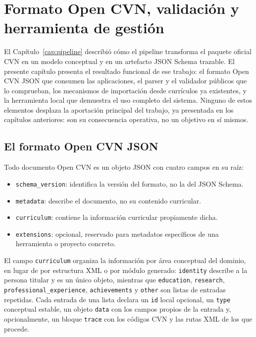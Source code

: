 \chapter{Formato Open CVN, validación y herramienta de gestión}
\label{cap:formato_herramienta}

El Capítulo~\ref{cap:pipeline} describió cómo el pipeline transforma el
paquete oficial CVN en un modelo conceptual y en un artefacto JSON Schema
trazable. El presente capítulo presenta el resultado funcional de ese
trabajo: el formato Open CVN JSON que consumen las aplicaciones, el parser y
el validador públicos que lo comprueban, los mecanismos de importación desde
currículos ya existentes, y la herramienta local que demuestra el uso
completo del sistema. Ninguno de estos elementos desplaza la aportación
principal del trabajo, ya presentada en los capítulos anteriores: son su
consecuencia operativa, no un objetivo en sí mismos.

\section{El formato Open CVN JSON}
\label{sec:formato_json}

Todo documento Open CVN es un objeto JSON con cuatro campos en su raíz:

\begin{itemize}
  \item \texttt{schema\_version}: identifica la versión del formato, no la
  del JSON Schema.

  \item \texttt{metadata}: describe el documento, no su contenido
  curricular.

  \item \texttt{curriculum}: contiene la información curricular propiamente
  dicha.

  \item \texttt{extensions}: opcional, reservado para metadatos específicos
  de una herramienta o proyecto concreto.
\end{itemize}

El campo \texttt{curriculum} organiza la información por área conceptual del
dominio, en lugar de por estructura XML o por módulo generado: \texttt{identity}
describe a la persona titular y es un único objeto, mientras que
\texttt{education}, \texttt{research}, \texttt{professional\_experience},
\texttt{achievements} y \texttt{other} son listas de entradas repetidas. Cada
entrada de una lista declara un \texttt{id} local opcional, un \texttt{type}
conceptual estable, un objeto \texttt{data} con los campos propios de la
entrada y, opcionalmente, un bloque \texttt{trace} con los códigos CVN y las
rutas XML de los que procede.

